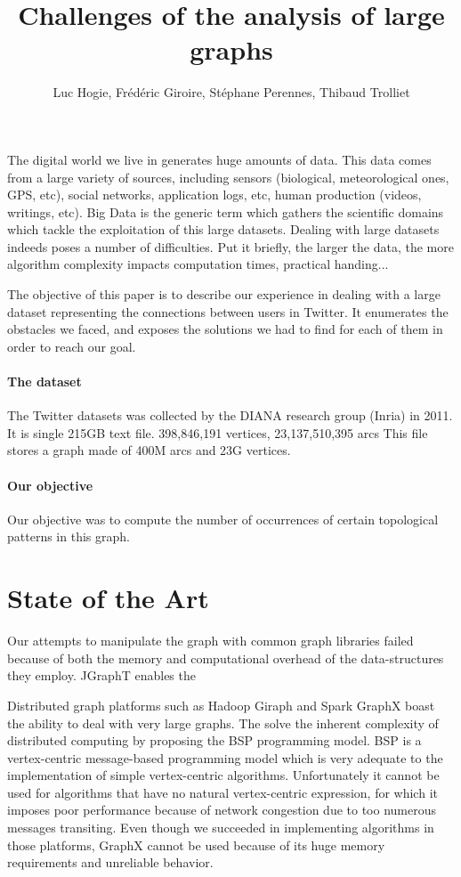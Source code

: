 \documentclass[11pt,a4paper]{article}
\title{Challenges of the analysis of large graphs}
\author{Luc Hogie, Frédéric Giroire, Stéphane Perennes, Thibaud Trolliet}
\begin{document}
\maketitle

The digital world we live in generates  huge amounts of data. This data comes from a large variety of sources, including sensors (biological, meteorological ones, GPS, etc), social networks, application logs, etc, human production (videos, writings, etc). Big Data is the generic term which gathers the scientific domains which tackle the exploitation of this large datasets.
Dealing with large datasets indeeds poses a number of difficulties. Put it briefly, the larger the data, the more algorithm complexity impacts computation times, practical handing...

The objective of this paper is to describe our experience in dealing with
a large dataset representing the connections between users in Twitter. It enumerates the obstacles we faced, and exposes the solutions we had
to find for each of them in order to reach our goal.

\paragraph{The dataset}
{
The Twitter datasets was collected by the DIANA research group (Inria) in 2011. It is single 215GB text file. 
398,846,191 vertices, 23,137,510,395 arcs
This file stores a graph made of 400M arcs and 23G vertices. 
}

\paragraph{Our objective}
{
Our objective was to compute the number of occurrences of certain topological patterns in this graph.
}




\section{State of the Art}

Our attempts to manipulate the graph with common graph libraries failed because  of both the memory and computational overhead of the data-structures they employ.
JGraphT enables the

Distributed graph platforms such as Hadoop Giraph and Spark GraphX boast the ability to deal with very large graphs.  The solve the inherent complexity of distributed computing by proposing the BSP programming model. BSP is a vertex-centric message-based programming model which is very adequate to the implementation of simple vertex-centric algorithms. Unfortunately it cannot be used for algorithms that have no natural vertex-centric expression, for which it imposes poor performance because of network congestion due to too numerous messages transiting.
Even though we succeeded in implementing algorithms in those platforms, GraphX cannot be used because of its huge memory requirements and unreliable behavior.
\end{document}
